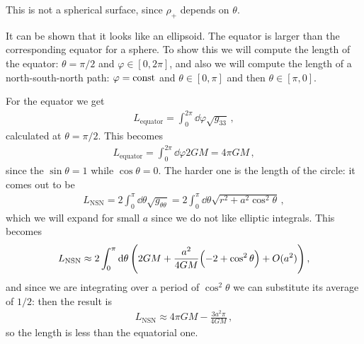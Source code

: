 \documentclass[main.tex]{subfiles}
\begin{document}
This is not a spherical surface, since \(\rho_{+}\) depends on \(\theta \). 

It can be shown that it looks like an ellipsoid. The equator is larger than the corresponding equator for a sphere. To show this we will compute the length of the equator: \(\theta = \pi /2\) and \(\varphi \in [0, 2 \pi ]\), and also we will compute the length of a north-south-north path: \(\varphi = \text{const}\) and \(\theta \in [0, \pi ]\) and then \(\theta \in [\pi , 0]\).

For the equator we get 
%
\begin{align}
  L _{\text{equator}} = \int_{0}^{2 \pi } \dd{\varphi } \sqrt{g_{33}}
\,,
\end{align}
%
calculated at \(\theta = \pi /2\). This becomes 
%
\begin{align}
  L _{\text{equator}} = \int_{0}^{2 \pi } \dd{\varphi } 2GM = 4 \pi GM
\,,
\end{align}
%
since the \(\sin \theta = 1\) while \(\cos \theta = 0\). The harder one is the length of the circle: it comes out to be 
%
\begin{align}
  L _{\text{NSN}} = 2 \int_{0}^{\pi }  \dd{\theta } \sqrt{g_{\theta \theta }}
  = 2 \int_{0}^{\pi } \dd{\theta } \sqrt{r^2 + a^2 \cos^2\theta }
\,,
\end{align}
%
which we will expand for small \(a\) since we do not like elliptic integrals. This becomes 
%
\begin{align}
  L _{\text{NSN}} \approx 2 \int_{0}^{\pi } \dd{\theta } \qty(2GM + \frac{a^2}{4GM} \qty(-2 + \cos^2 \theta )  + O(a^2))
\,,
\end{align}
%
and since we are integrating over a period of \(\cos^2\theta\) we can substitute its average of \(1/2\): then the result is 
%
\begin{align}
L _{\text{NSN}} \approx 4\pi GM - \frac{3a^2 \pi }{4GM}
\,,
\end{align}
%
so the length is less than the equatorial one. 
\end{document}
